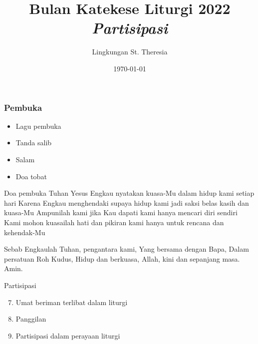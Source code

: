 \documentclass[aspectratio=169]{beamer}
\title[BKL: Partisipasi]{Bulan Katekese Liturgi 2022\\\textit{\textbf{\Large Partisipasi}}}
\author{Lingkungan St. Theresia}
\date{\today}
\begin{document}
\begin{frame}
    \titlepage 
\end{frame}

\logo{}

\begin{frame}[fragile]
\frametitle{Pembuka}
\begin{itemize}[<+->]
    \item Lagu pembuka
    \item Tanda salib
	\item Salam 
    \item Doa tobat
\end{itemize}

\begin{block}{Doa pembuka}
Tuhan Yesus
Engkau nyatakan kuasa-Mu dalam hidup kami setiap hari
Karena Engkau menghendaki supaya hidup kami jadi saksi belas kasih dan kuasa-Mu
Ampunilah kami jika Kau dapati kami hanya mencari diri sendiri
Kami mohon kuasailah hati dan pikiran kami hanya untuk rencana dan kehendak-Mu

Sebab Engkaulah Tuhan, pengantara kami,
Yang bersama dengan Bapa,
Dalam persatuan Roh Kudus,
Hidup dan berkuasa,
Allah, kini dan sepanjang masa. Amin.
\end{block}
\end{frame}


\begin{frame}{Partisipasi}
\begin{enumerate}[<+->]
    \setcounter{enumi}{6}
	\item Umat beriman terlibat dalam liturgi
    \item Panggilan
    \item Partisipasi dalam perayaan liturgi
\end{enumerate}
\end{frame}


\end{document}
